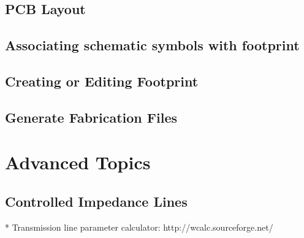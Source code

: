 \documentclass[12pt,letterpaper]{scrartcl}
\begin{document}
\subsection{PCB Layout}
\subsection{Associating schematic symbols with footprint}
\subsection{Creating or Editing Footprint}
\subsection{Generate Fabrication Files}

\section{Advanced Topics}

\subsection{Controlled Impedance Lines}

* Transmission line parameter calculator: http://wcalc.sourceforge.net/

\newpage



\end{document}
